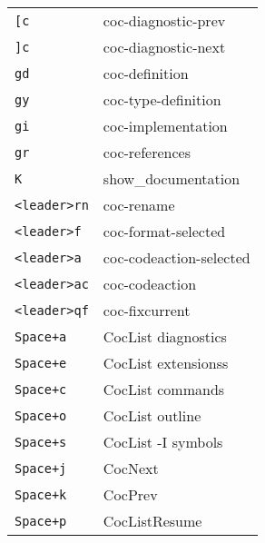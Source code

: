 \begin{multicols}{3}
\section{}
\begin{tabular}{@{}ll@{}}
	\verb![c! & coc-diagnostic-prev \\
	\verb!]c! & coc-diagnostic-next \\
	\verb!gd! & coc-definition  \\
	\verb!gy! & coc-type-definition \\
	\verb!gi! & coc-implementation \\
	\verb!gr! & coc-references  \\
	\verb!K! & show\_documentation \\
	\verb!<leader>rn! & coc-rename \\
	\verb!<leader>f ! & coc-format-selected \\
	\verb!<leader>a ! & coc-codeaction-selected \\
	\verb!<leader>ac! & coc-codeaction \\
    \verb!<leader>qf! & coc-fixcurrent \\
	\verb!Space+a! & CocList diagnostics \\
	\verb!Space+e! & CocList extensionss \\
	\verb!Space+c! & CocList commands \\
	\verb!Space+o! & CocList outline \\
	\verb!Space+s! & CocList -I symbols \\
	\verb!Space+j! & CocNext        \\
	\verb!Space+k! & CocPrev        \\
	\verb!Space+p! & CocListResume  \\
\end{tabular}


\end{multicols}

